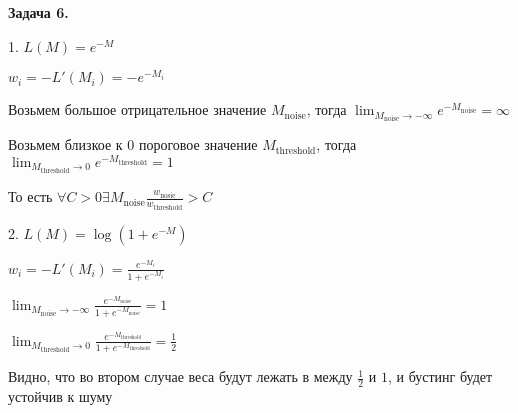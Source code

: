 \documentclass{article}
\begin{document}
    \textbf {Задача 6.}

    1. $L(M)=e^{-M}$

    $w_i = -L'(M_i)=-e^{-M_i}$

    Возьмем большое отрицательное значение $M_{\text{noise}}$, тогда $\lim_{M_{\text{noise}}\to-\infty}e^{-M_{\text{noise}}}=\infty$

    Возьмем близкое к 0 пороговое значение $M_{\text{threshold}}$, тогда $\lim_{M_{\text{threshold}}\to 0}e^{-M_{\text{threshold}}}=1$

    То есть $\forall C>0 \exists M_{\text{noise}} \frac{w_{\text{nosie}}}{w_{\text{threshold}}}>C$

    2. $L(M)=\log(1+e^{-M})$

    $w_{i}=-L'(M_i)=\frac{e^{-M_i}}{1+e^{-M_i}}$

    $\lim_{M_{\text{noise}}\to-\infty}\frac{e^{-M_{\text{noise}}}}{1+e^{-M_{\text{noise}}}}=1$

    $\lim_{M_{\text{threshold}}\to 0}\frac{e^{-M_{\text{threshold}}}}{1+e^{-M_{\text{threshold}}}}=\frac{1}{2}$

    Видно, что во втором случае веса будут лежать в между $\frac{1}{2}$ и $1$, и бустинг будет устойчив к шуму
\end{document}

